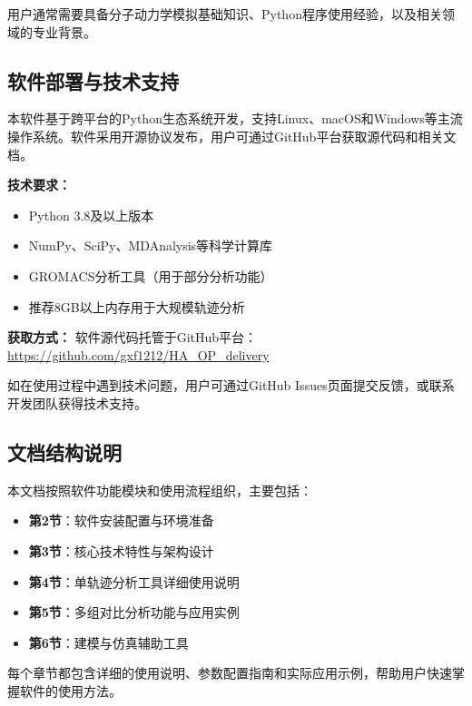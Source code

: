 用户通常需要具备分子动力学模拟基础知识、Python程序使用经验，以及相关领域的专业背景。

\subsection{软件部署与技术支持}
\label{ssec:intro_deployment_support}
本软件基于跨平台的Python生态系统开发，支持Linux、macOS和Windows等主流操作系统。软件采用开源协议发布，用户可通过GitHub平台获取源代码和相关文档。

\textbf{技术要求：}
\begin{itemize}
    \item Python 3.8及以上版本
    \item NumPy、SciPy、MDAnalysis等科学计算库
    \item GROMACS分析工具（用于部分分析功能）
    \item 推荐8GB以上内存用于大规模轨迹分析
\end{itemize}

\textbf{获取方式：}
软件源代码托管于GitHub平台：\url{https://github.com/gxf1212/HA_OP_delivery}

如在使用过程中遇到技术问题，用户可通过GitHub Issues页面提交反馈，或联系开发团队获得技术支持。

\subsection{文档结构说明}
\label{ssec:document_structure}
本文档按照软件功能模块和使用流程组织，主要包括：
\begin{itemize}
    \item \textbf{第2节}：软件安装配置与环境准备
    \item \textbf{第3节}：核心技术特性与架构设计
    \item \textbf{第4节}：单轨迹分析工具详细使用说明
    \item \textbf{第5节}：多组对比分析功能与应用实例
    \item \textbf{第6节}：建模与仿真辅助工具
\end{itemize}

每个章节都包含详细的使用说明、参数配置指南和实际应用示例，帮助用户快速掌握软件的使用方法。